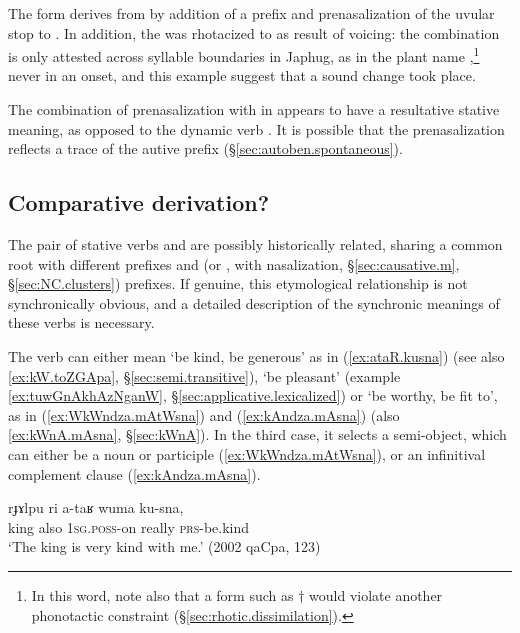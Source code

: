 The form  derives from  by addition of a prefix  and prenasalization of the uvular stop  to . In addition,  the  was rhotacized to  as result of voicing: the combination  is only attested across syllable boundaries in Japhug, as in the  plant name ,\footnote{In this word, note also that a form such as $\dagger$ would violate another phonotactic constraint (§\ref{sec:rhotic.dissimilation}). } never in an onset, and this example suggest that a sound change  \fl{}  took place.

The combination of prenasalization with  in  appears to have a resultative stative meaning, as opposed to the dynamic verb . It is possible that the prenasalization reflects a trace of the autive prefix (§\ref{sec:autoben.spontaneous}).

\subsection{Comparative derivation?} \label{sec:mna.sna}
The pair of stative verbs  and  are possibly historically related, sharing a common root  with different prefixes  and  (or , with nasalization, §\ref{sec:causative.m}, §\ref{sec:NC.clusters}) prefixes. If genuine, this etymological relationship is not synchronically obvious, and a detailed description of the synchronic meanings of these verbs is necessary.

The verb  can either mean `be kind, be generous' as in (\ref{ex:ataR.kusna}) (see also \ref{ex:kW.toZGApa}, §\ref{sec:semi.transitive}), `be pleasant' (example \ref{ex:tuwGnAkhAzNganW}, §\ref{sec:applicative.lexicalized}) or `be worthy, be fit to', as in (\ref{ex:WkWndza.mAtWsna}) and (\ref{ex:kAndza.mAsna}) (also \ref{ex:kWnA.mAsna}, §\ref{sec:kWnA}). In the third case, it selects a semi-object, which can either be a noun or participle (\ref{ex:WkWndza.mAtWsna}), or an infinitival complement clause (\ref{ex:kAndza.mAsna}).

\begin{exe}
\ex \label{ex:ataR.kusna}
\gll rɟɤlpu ri a-taʁ wuma ku-sna, \\
king also \textsc{1sg}.\textsc{poss}-on really \textsc{prs}-be.kind \\
\glt `The king is very kind with me.' (2002 qaCpa, 123)
\end{exe}

